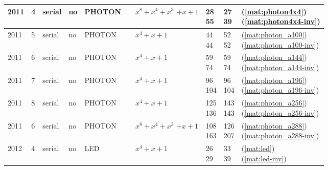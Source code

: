 \begin{footnotesize}
\begin{longtable}[c]{|l|l|l|l|l|l|l|l|l|l|}
2011 & 4 & serial & no & PHOTON & \cite{PHOTON2011} & \shortstack{$x^8 + x^4 + x^3$\\$+ x + 1$} & \shortstack{28\\55} & \shortstack{27\\39} & \shortstack{(\ref{mat:photon4x4})\\(\ref{mat:photon4x4-inv})} \\ \hline
2011 & 5 & serial & no & PHOTON & \cite{PHOTON2011} & $x^4+x+1$ & \shortstack{44\\44} & \shortstack{52\\52} & \shortstack{(\ref{mat:photon_a100})\\(\ref{mat:photon_a100-inv})} \\ \hline
2011 & 6 & serial & no & PHOTON & \cite{PHOTON2011} & $x^4+x+1$ & \shortstack{59\\74} & \shortstack{59\\74} & \shortstack{(\ref{mat:photon_a144})\\(\ref{mat:photon_a144-inv})} \\ \hline
2011 & 7 & serial & no & PHOTON & \cite{PHOTON2011} & $x^4+x+1$ & \shortstack{96\\104} & \shortstack{96\\104} & \shortstack{(\ref{mat:photon_a196})\\(\ref{mat:photon_a196-inv})} \\ \hline
2011 & 8 & serial & no & PHOTON & \cite{PHOTON2011} & $x^4+x+1$ & \shortstack{125\\136} & \shortstack{143\\143} & \shortstack{(\ref{mat:photon_a256})\\(\ref{mat:photon_a256-inv})} \\ \hline
2011 & 6 & serial & no & PHOTON & \cite{PHOTON2011} & \shortstack{$x^8 + x^4 + x^3$\\$+ x + 1$} & \shortstack{108\\163} & \shortstack{126\\207} & \shortstack{(\ref{mat:photon_a288})\\(\ref{mat:photon_a288-inv})} \\ \hline

2012 & 4 & serial & no & LED & \cite{LED2012} & $x^4+x+1$ & \shortstack{26\\29} & \shortstack{33\\39} & \shortstack{(\ref{mat:led})\\(\ref{mat:led-inv})} \\ \hline


\end{longtable}
\end{footnotesize}
